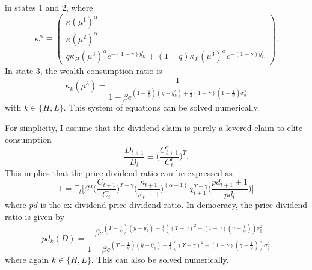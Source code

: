 in states 1 and 2, where
\begin{equation}
\boldsymbol{\kappa}^{\alpha}\equiv\begin{pmatrix}\kappa(\mu^{1})^{\alpha}\\
\kappa(\mu^{2})^{\alpha}\\
q \kappa_H(\mu^{3})^{\alpha} e^{-(1-\gamma)\bar{y}^r_H} + (1-q) \kappa_L(\mu^{3})^{\alpha} e^{-(1-\gamma)\bar{y}^r_L} 
\end{pmatrix}.
\end{equation}
In state 3, the wealth-consumption ratio is
$$
\kappa_k(\mu^{3})=\frac{1}{1-\beta e^{(1-\frac{1}{\psi})(\bar{y}-\bar{y}^r_k)+\frac{1}{2}(1-\gamma)(1-\frac{1}{\psi})\sigma_y^{2}}}
$$
with $k\in\{H,L\}$. This system of equations can be solved numerically.

For simplicity, I assume that the dividend claim is purely a levered claim to elite consumption
\begin{equation*}
\frac{D_{t+1}}{D_{t}} \equiv \bigg(\frac{C^r_{t+1}}{C^r_{t}}\bigg)^{\Upsilon}.
\end{equation*}
This implies that the price-dividend ratio can be expressed as
\begin{equation}
1=\mathbb{E}_t\bigg[\beta^{\alpha}\bigg(\frac{C_{t+1}}{C_{t}}\bigg)^{\Upsilon-\gamma}\bigg(\frac{\kappa_{t+1}}{\kappa_t - 1}\bigg)^{(\alpha-1)} \chi^{\Upsilon-\gamma}_{t+1} \bigg(\frac{pd_{t+1}+1}{pd_{t}}\bigg)\bigg]
\end{equation}
where $pd$ is the ex-dividend price-dividend ratio. In democracy, the price-dividend ratio is given by
\begin{equation}
pd_k(D) = \frac{\beta e^{(\Upsilon-\frac{1}{\psi})(\bar{y}-\bar{y}^r_k)+\frac{1}{2}((\Upsilon-\gamma)^2 + (1-\gamma)(\gamma-\frac{1}{\psi}))\sigma_y^{2}}}{1-\beta e^{(\Upsilon-\frac{1}{\psi})(\bar{y}-\bar{y}^r_k)+\frac{1}{2}((\Upsilon-\gamma)^2 + (1-\gamma)(\gamma-\frac{1}{\psi}))\sigma_y^{2}}}
\end{equation}
where again $k\in\{H,L\}$. This can also be solved numerically.
